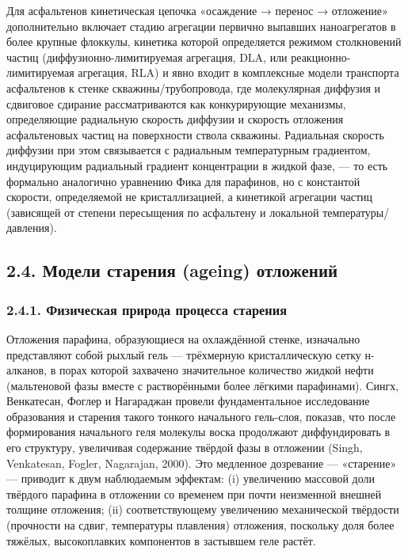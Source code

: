 \documentclass[11pt]{extarticle}
\begin{document}
Для асфальтенов кинетическая цепочка «осаждение → перенос → отложение» дополнительно включает стадию агрегации первично выпавших наноагрегатов в более крупные флоккулы, кинетика которой определяется режимом столкновений частиц (диффузионно-лимитируемая агрегация, DLA, или реакционно-лимитируемая агрегация, RLA) и явно входит в комплексные модели транспорта асфальтенов к стенке скважины/трубопровода, где молекулярная диффузия и сдвиговое сдирание рассматриваются как конкурирующие механизмы, определяющие радиальную скорость диффузии и скорость отложения асфальтеновых частиц на поверхности ствола скважины. Радиальная скорость диффузии при этом связывается с радиальным температурным градиентом, индуцирующим радиальный градиент концентрации в жидкой фазе, --- то есть формально аналогично уравнению Фика для парафинов, но с константой скорости, определяемой не кристаллизацией, а кинетикой агрегации частиц (зависящей от степени пересыщения по асфальтену и локальной температуры/давления).

\subsection{2.4. Модели старения (ageing) отложений}\label{ux43cux43eux434ux435ux43bux438-ux441ux442ux430ux440ux435ux43dux438ux44f-ageing-ux43eux442ux43bux43eux436ux435ux43dux438ux439}

\subsubsection{2.4.1. Физическая природа процесса старения}\label{ux444ux438ux437ux438ux447ux435ux441ux43aux430ux44f-ux43fux440ux438ux440ux43eux434ux430-ux43fux440ux43eux446ux435ux441ux441ux430-ux441ux442ux430ux440ux435ux43dux438ux44f}

Отложения парафина, образующиеся на охлаждённой стенке, изначально представляют собой рыхлый гель --- трёхмерную кристаллическую сетку н-алканов, в порах которой захвачено значительное количество жидкой нефти (мальтеновой фазы вместе с растворёнными более лёгкими парафинами). Сингх, Венкатесан, Фоглер и Нагараджан провели фундаментальное исследование образования и старения такого тонкого начального гель-слоя, показав, что после формирования начального геля молекулы воска продолжают диффундировать в его структуру, увеличивая содержание твёрдой фазы в отложении (Singh, Venkatesan, Fogler, Nagarajan, 2000). Это медленное дозревание --- «старение» --- приводит к двум наблюдаемым эффектам: (i) увеличению массовой доли твёрдого парафина в отложении со временем при почти неизменной внешней толщине отложения; (ii) соответствующему увеличению механической твёрдости (прочности на сдвиг, температуры плавления) отложения, поскольку доля более тяжёлых, высокоплавких компонентов в застывшем геле растёт.
\end{document}
